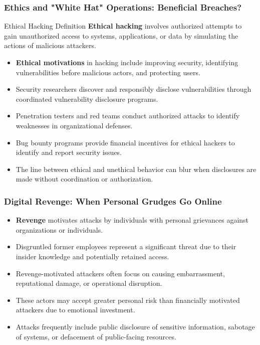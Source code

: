 \documentclass{beamer}
\begin{document}
\begin{frame}
    \frametitle{Ethics and "White Hat" Operations: Beneficial Breaches?}
    
    \begin{block}{Ethical Hacking Definition}
        \textbf{Ethical hacking} involves authorized attempts to gain unauthorized access to systems, applications, or data by simulating the actions of malicious attackers.
    \end{block}
    
    \begin{itemize}
        \item \textbf{Ethical motivations} in hacking include improving security, identifying vulnerabilities before malicious actors, and protecting users.
        \item Security researchers discover and responsibly disclose vulnerabilities through coordinated vulnerability disclosure programs.
        \item Penetration testers and red teams conduct authorized attacks to identify weaknesses in organizational defenses.
        \item Bug bounty programs provide financial incentives for ethical hackers to identify and report security issues.
        \item The line between ethical and unethical behavior can blur when disclosures are made without coordination or authorization.
    \end{itemize}
\end{frame}

\begin{frame}
    \frametitle{Digital Revenge: When Personal Grudges Go Online}
    
    \begin{itemize}
        \item \textbf{Revenge} motivates attacks by individuals with personal grievances against organizations or individuals.
        \item Disgruntled former employees represent a significant threat due to their insider knowledge and potentially retained access.
        \item Revenge-motivated attackers often focus on causing embarrassment, reputational damage, or operational disruption.
        \item These actors may accept greater personal risk than financially motivated attackers due to emotional investment.
        \item Attacks frequently include public disclosure of sensitive information, sabotage of systems, or defacement of public-facing resources.
    \end{itemize}
\end{frame}
\end{document}
